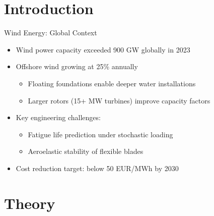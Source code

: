 
\section{Introduction}

\begin{frame}{Wind Energy: Global Context}
    \begin{itemize}
        \item Wind power capacity exceeded 900 GW globally in 2023
        \item Offshore wind growing at 25\% annually
            \begin{itemize}
                \item Floating foundations enable deeper water installations
                \item Larger rotors (15+ MW turbines) improve capacity factors
            \end{itemize}
        \item Key engineering challenges:
            \begin{itemize}
                \item Fatigue life prediction under stochastic loading
                \item Aeroelastic stability of flexible blades
            \end{itemize}
        \item Cost reduction target: below 50 EUR/MWh by 2030
    \end{itemize}
\end{frame}

\section{Theory}

